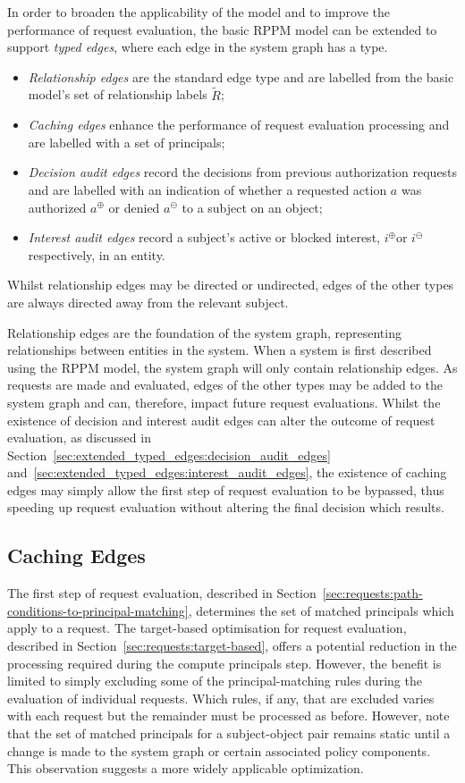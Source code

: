\documentclass{article}
\newcommand{\RcoR}{\ensuremath{\widetilde{R}}} \newcommand{\entity}[1]{\ensuremath{#1}} \newcommand{\rel}[1]{\ensuremath{#1}} \newcommand{\relw}[1]{\textsf{#1}} \newcommand{\comp}{\mathbin{;}} \newcommand{\relpc}[1]{\textsf{#1}} \newcommand{\princ}[1]{\textsf{#1}} \newcommand{\ppmc}{\ensuremath{\phi}} \newcommand{\npmc}{\ensuremath{\psi}} \newcommand{\pmp}{\ensuremath{\rho}} \newcommand{\act}[1]{\textsf{#1}} \newcommand{\crs}{\ensuremath{\chi}} \newcommand{\crso}[1]{\textsf{#1}} \newcommand{\defo}[1]{#1} \newcommand{\mpalg}{\textsf{MatchPrincipal}\xspace} \renewcommand{\algorithmiccomment}[1]{// #1} \newcommand{\audita}[1]{\ensuremath{#1^\oplus}}
\newcommand{\auditd}[1]{\ensuremath{#1^\ominus}}
\newcommand{\interesta}{\ensuremath{i^\oplus}}
\newcommand{\interestb}{\ensuremath{i^\ominus}}
\begin{document}
In order to broaden the applicability of the model and to improve the performance of request evaluation, the basic RPPM model can be extended to support \emph{typed edges}, where each edge in the system graph has a type.
\begin{itemize}
    \item \emph{Relationship edges} are the standard edge type and are labelled from the basic model's set of relationship labels $\RcoR$;
    \item \emph{Caching edges} enhance the performance of request evaluation processing and are labelled with a set of principals;
    \item \emph{Decision audit edges} record the decisions from previous authorization requests and are labelled with an indication of whether a requested action $a$ was authorized $\audita{a}$ or denied $\auditd{a}$ to a subject on an object;
    \item \emph{Interest audit edges} record a subject's active or blocked interest, \interesta  or \interestb respectively, in an entity.
\end{itemize}
Whilst relationship edges may be directed or undirected,  edges of the other types are always directed away from the relevant subject.

Relationship edges are the foundation of the system graph, representing relationships between entities in the system.
When a system is first described using the RPPM model, the system graph will only contain relationship edges.
As requests are made and evaluated, edges of the other types may be added to the system graph and can, therefore, impact future request evaluations.
Whilst the existence of decision and interest audit edges can alter the outcome of request evaluation, as discussed in Section~\ref{sec:extended_typed_edges:decision_audit_edges} and~\ref{sec:extended_typed_edges:interest_audit_edges}, the existence of caching edges may simply allow the first step of request evaluation to be bypassed, thus speeding up request evaluation without altering the final decision which results.

\subsection{Caching Edges}\label{sec:extended_typed_edges:caching_edges}
The first step of request evaluation, described in Section~\ref{sec:requests:path-conditions-to-principal-matching}, determines the set of matched principals which apply to a request.
The target-based optimisation for request evaluation, described in Section~\ref{sec:requests:target-based}, offers a potential reduction in the processing required during the compute principals step.
However, the benefit is limited to simply excluding some of the principal-matching rules during the evaluation of individual requests.
Which rules, if any, that are excluded varies with each request but the remainder must be processed as before.
However, note that the set of matched principals for a subject-object pair remains static until a change is made to the system graph or certain associated policy components.
This observation suggests a more widely applicable optimization.
\end{document}
